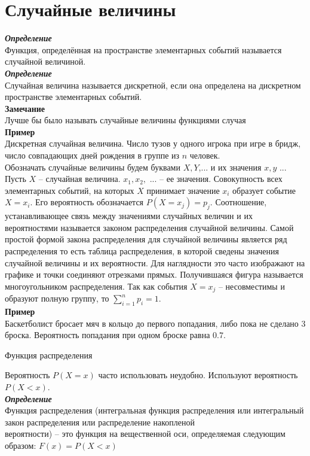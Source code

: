 \documentclass[russian, 12pt, fleqn]{article}
\begin{document}
\section{Случайные величины}
\noindent
\textit{\textbf{Определение}}\\
Функция, определённая на пространстве элементарных событий называется случайной величиной.\\
\textit{\textbf{Определение}}\\
Случайная величина называется дискретной, если она определена на дискретном пространстве элементарных событий.\\
\textbf{Замечание\ } \\ Лучше бы было называть случайные величины функциями случая\\
\textbf{Пример\ }\\Дискретная случайная величина. Число тузов у одного игрока при игре в бридж, число совпадающих дней рождения в группе из $n$ человек.\\
Обозначать случайные величины будем буквами $X, Y$,... и их значения $x, y$ ...
Пусть $X$ -- случайная величина. $x_1, x_2,$ ...  --  ее значения. Совокупность всех элементарных событий, на которых $X$ принимает значение $x_i$ образует событие $X=x_i$.
Его вероятность обозначается $P(X=x_j) = p_j$. Соотношение, устанавливающее связь между значениями случайных величин и их вероятностями называется законом распределения случайной величины. Самой простой формой закона распределения для случайной величины является ряд распределения то есть таблица распределения, в которой сведены значения случайной величины и их вероятности. Для наглядности это часто изображают на графике и точки соединяют отрезками прямых. Получившаяся фигура называется многоугольником распределения. Так как события $X=x_j$ -- несовместимы и образуют полную группу, то $\sum\limits_{i = 1}^{n}p_i = 1$.\\
\textbf{Пример\ }\\
Баскетболист бросает мяч в кольцо до первого попадания, либо пока не сделано 3 броска. Вероятность попадания при одном броске равна $0.7$.\\
\begin{center}
$\textbf{Функция распределения }$\\
\end{center}
Вероятность $P(X=x)$ часто использовать неудобно. Используют вероятность $P(X<x).$\\
\textit{\textbf{Определение}}\\
Функция распределения (интегральная функция распределения или интегральный закон распределения или распределение накопленой\\ вероятности)  -- это функция на вещественной оси, определяемая следующим образом: $F(x)=P(X<x)$\\
\end{document}
